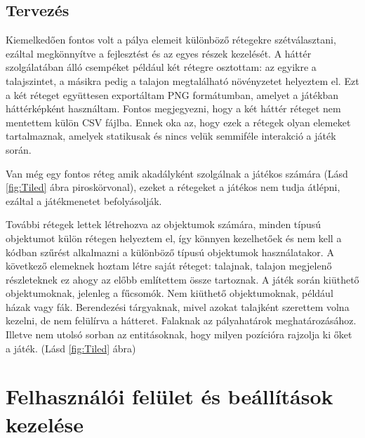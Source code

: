 \subsection{Tervezés} \label{subsec:Tervezés}

 Kiemelkedően fontos volt a pálya elemeit különböző rétegekre szétválasztani, ezáltal megkönnyítve a fejlesztést és az egyes részek kezelését. A háttér szolgálatában álló csempéket például két rétegre osztottam: az egyikre a talajszintet, a másikra pedig a talajon megtalálható növényzetet helyeztem el. Ezt a két réteget együttesen exportáltam PNG formátumban, amelyet a játékban háttérképként használtam. Fontos megjegyezni, hogy a két háttér réteget nem mentettem külön CSV fájlba. Ennek oka az, hogy ezek a rétegek olyan elemeket tartalmaznak, amelyek statikusak és nincs velük semmiféle interakció a játék során. 

Van még egy fontos réteg amik akadályként szolgálnak a játékos számára (Lásd \ref{fig:Tiled} ábra piroskörvonal), ezeket a rétegeket a játékos nem tudja átlépni, ezáltal a játékmenetet befolyásolják.  

További rétegek lettek létrehozva az objektumok számára, minden típusú objektumot külön rétegen helyeztem el, így könnyen kezelhetőek és nem kell a kódban szűrést alkalmazni a különböző típusú objektumok használatakor.
A következő elemeknek hoztam létre saját réteget: talajnak, talajon megjelenő részleteknek ez ahogy az előbb említettem össze tartoznak. A játék során kiüthető objektumoknak, jelenleg a fűcsomók. Nem kiüthető objektumoknak, például házak vagy fák. Berendezési tárgyaknak, mivel azokat talajként szerettem volna kezelni, de nem felülírva a hátteret. Falaknak az pályahatárok meghatározásához. Illetve nem utolsó sorban az entitásoknak, hogy milyen pozícióra rajzolja ki őket a játék.  (Lásd \ref{fig:Tiled} ábra)



\section{Felhasználói felület és beállítások kezelése}

